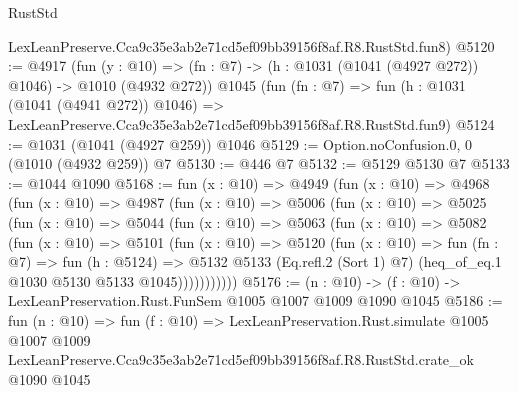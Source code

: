 \begin{lexlean}{RustStd}
\begin{coremodule}
    LexLeanPreserve.Cca9c35e3ab2e71cd5ef09bb39156f8af.R8.RustStd.fun8)
@5120 := @4917
    (fun (y : @10) => (fn : @7) -> (h : @1031 (@1041 (@4927 @272)) @1046) -> @1010 (@4932 @272))
    @1045
    (fun (fn : @7) =>
    fun (h : @1031 (@1041 (@4941 @272)) @1046) =>
    LexLeanPreserve.Cca9c35e3ab2e71cd5ef09bb39156f8af.R8.RustStd.fun9)
@5124 := @1031 (@1041 (@4927 @259)) @1046
@5129 := Option.noConfusion.{0, 0} (@1010 (@4932 @259)) @7
@5130 := @446 @7
@5132 := @5129 @5130 @7
@5133 := @1044 @1090
@5168 := fun (x : @10) =>
  @4949
    (fun (x : @10) =>
    @4968
      (fun (x : @10) =>
      @4987
        (fun (x : @10) =>
        @5006
          (fun (x : @10) =>
          @5025
            (fun (x : @10) =>
            @5044
              (fun (x : @10) =>
              @5063
                (fun (x : @10) =>
                @5082
                  (fun (x : @10) =>
                  @5101
                    (fun (x : @10) =>
                    @5120
                      (fun (x : @10) =>
                      fun (fn : @7) =>
                      fun (h : @5124) =>
                      @5132
                        @5133
                        (Eq.refl.{2} (Sort 1) @7)
                        (heq_of_eq.{1} @1030 @5130 @5133 @1045)))))))))))
@5176 := (n : @10) -> (f : @10) -> LexLeanPreservation.Rust.FunSem @1005 @1007 @1009 @1090 @1045
@5186 := fun (n : @10) =>
  fun (f : @10) =>
  LexLeanPreservation.Rust.simulate
    @1005
    @1007
    @1009
    LexLeanPreserve.Cca9c35e3ab2e71cd5ef09bb39156f8af.R8.RustStd.crate_ok
    @1090
    @1045
\end{coremodule}
\end{lexlean}
